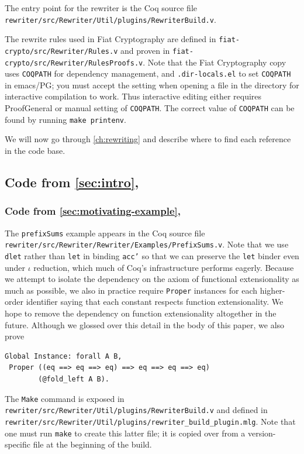 \begin{subappendices}
The entry point for the rewriter is the Coq source file \texttt{rewriter/src/Rewriter/Util/plugins/RewriterBuild.v}.

The rewrite rules used in Fiat Cryptography are defined in \texttt{fiat-crypto/src/Rewriter/Rules.v} and proven in \texttt{fiat-crypto/src/Rewriter/RulesProofs.v}.
Note that the Fiat Cryptography copy uses \verb|COQPATH| for dependency management, and \verb|.dir-locals.el| to set \verb|COQPATH| in emacs/PG; you must accept the setting when opening a file in the directory for interactive compilation to work.
Thus interactive editing either requires ProofGeneral or manual setting of \verb|COQPATH|.
The correct value of \verb|COQPATH| can be found by running \verb|make printenv|.

We will now go through \autoref{ch:rewriting} and describe where to find each reference in the code base.

\newcommand{\autocommanameref}[1]{\autoref{#1}, \nameref{#1}}

\subsection{Code from \autocommanameref{sec:intro}}

\subsubsection{Code from \autocommanameref{sec:motivating-example}}

The \texttt{prefixSums} example appears in the Coq source file \texttt{rewriter/src/Rewriter/Rewriter/Examples/PrefixSums.v}.
Note that we use \texttt{dlet} rather than \texttt{let} in binding \texttt{acc'} so that we can preserve the \texttt{let} binder even under $\iota$ reduction, which much of Coq's infrastructure performs eagerly.
Because we attempt to isolate the dependency on the axiom of functional extensionality as much as possible, we also in practice require \texttt{Proper} instances for each higher-order identifier saying that each constant respects function extensionality.
We hope to remove the dependency on function extensionality altogether in the future.
Although we glossed over this detail in the body of this paper, we also prove
\begin{verbatim}
Global Instance: forall A B,
 Proper ((eq ==> eq ==> eq) ==> eq ==> eq ==> eq)
        (@fold_left A B).
\end{verbatim}

The \texttt{Make} command is exposed in \texttt{rewriter/src/Rewriter/Util/plugins/RewriterBuild.v} and defined in \texttt{rewriter/src/Rewriter/Util/plugins/rewriter\_build\_plugin.mlg}.
Note that one must run \texttt{make} to create this latter file; it is copied over from a version-specific file at the beginning of the build.


\end{subappendices}
